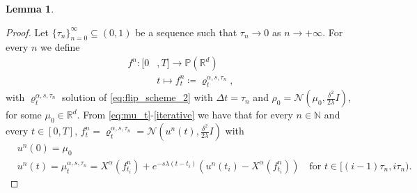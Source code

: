 \documentclass[reqno]{amsart}
\numberwithin{algorithm}{section}
\newcommand{\R}{\mathbb{R}}
\newtheorem{lemma}[theorem]{Lemma}
\begin{document}
{\begin{lemma}
\end{lemma}
\begin{proof}
    Let $\{\tau_n\}_{n=0}^\infty\subseteq(0,1)$ be a sequence such that $\tau_n\rightarrow0$ as $n\rightarrow +\infty$.
For every $n$ we define 
\begin{equation*}\begin{aligned}
    f^n:[0&,T]\longrightarrow \mathbb P(\R^d)\\
          &t \longmapsto f^n_t\coloneqq \varrho_t^{\alpha,s,\tau_n},
\end{aligned}\end{equation*}
with $\varrho_t^{\alpha,s,\tau_n}$ solution of \eqref{eq:flip_scheme_2} with $\Delta t=\tau_n$ and 
$\rho_0 = \mathcal N\left(\mu_0, \frac{\delta^2}{2\lambda}I\right)$, for some $\mu_0\in\mathbb R^d.$ 
From \eqref{eq:mu_t}-\eqref{iterative} we have that for every $n\in\mathbb N$ and every $t\in[0,T]$, $f^n_{t} = \varrho_t^{\alpha,s,\tau_n} = \mathcal N\left(u^n(t), \frac{\delta^2}{2\lambda}I\right)$ with 
\begin{equation*}
    \begin{aligned}
        & u^n(0) = \mu_0\\
        & u^n(t) = \mu_t^{\alpha,s,\tau_n}= X^\alpha(f^n_{t_i}) + e^{-s\lambda(t-t_i)} (u^n(t_i)-X^\alpha(f^n_{t_i})) \quad \text{for } t \in [(i-1)\tau_n, i\tau_n).
    \end{aligned}
\end{equation*}



\end{proof}}
\end{document}

